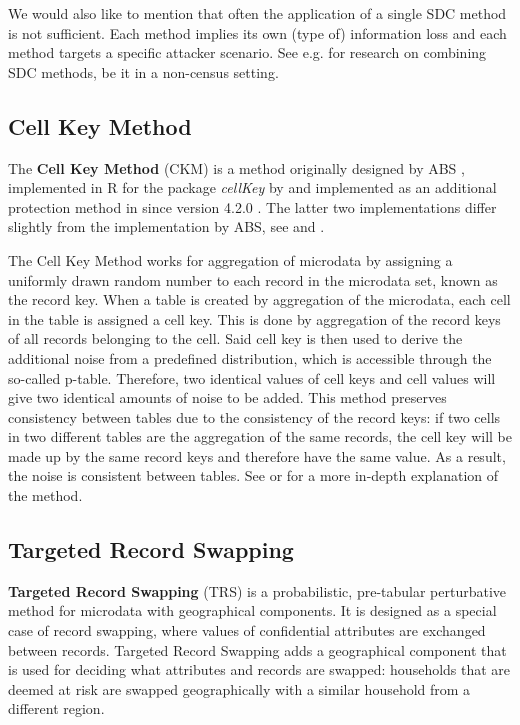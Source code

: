 We would also like to mention that often the application of a single SDC method is not sufficient. Each method implies its own (type of) information loss and each method targets a specific attacker scenario. See e.g. \cite{PietrzakEtal2022} for research on combining SDC methods, be it in a non-census setting.

\subsection{Cell Key Method}    
The \textbf{Cell Key Method} (CKM) is a method originally designed by ABS \cite{CKM_ABS}, implemented in R for the package \textit{cellKey} by \cite{cellkey_meindl} and implemented as an additional protection method in \targus since version 4.2.0 \cite{QuickRefTau42x}. The latter two implementations differ slightly from the implementation by ABS, see \cite{CKM_ABS} and \cite{cellkey_meindl}.
    
The Cell Key Method works for aggregation of microdata by assigning a uniformly drawn random number to each record in the microdata set, known as the record key. When a table is created by aggregation of the microdata, each cell in the table is assigned a cell key. This is done by aggregation of the record keys of all records belonging to the cell. Said cell key is then used to derive the additional noise from a predefined distribution, which is accessible through the so-called p-table. Therefore, two identical values of cell keys and cell values will give two identical amounts of noise to be added. 
This method preserves consistency between tables due to the consistency of the record keys: if two cells in two different tables are the aggregation of the same records, the cell key will be made up by the same record keys and therefore have the same value. As a result, the noise is consistent between tables. See \cite{CKM_ABS} or \cite{cellkey_meindl} for a more in-depth explanation of the method.

\subsection{Targeted Record Swapping}
    
\textbf{Targeted Record Swapping} (TRS) is a probabilistic, pre-tabular perturbative method for microdata with geographical components\cite{TRS_Shlomo}. It is designed as a special case of record swapping, where values of confidential attributes are exchanged between records. Targeted Record Swapping adds a geographical component that is used for deciding what attributes and records are swapped: households that are deemed at risk are swapped geographically with a similar household from a different region. 

